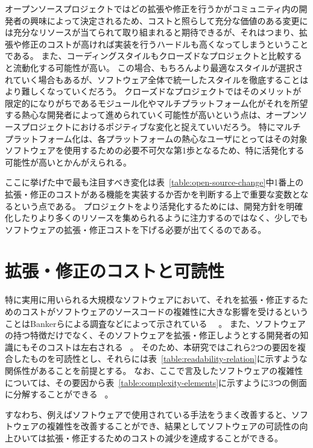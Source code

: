 オープンソースプロジェクトではどの拡張や修正を行うかがコミュニティ内の開発者の興味によって決定されるため、コストと照らして充分な価値のある変更には充分なリソースが当てられて取り組まれると期待できるが、それはつまり、拡張や修正のコストが高ければ実装を行うハードルも高くなってしまうということである。
また、コーディングスタイルもクローズドなプロジェクトと比較すると流動化する可能性が高い。
この場合、もちろんより最適なスタイルが選択されていく場合もあるが、ソフトウェア全体で統一したスタイルを徹底することはより難しくなっていくだろう。
クローズドなプロジェクトではそのメリットが限定的になりがちであるモジュール化やマルチプラットフォーム化がそれを所望する熱心な開発者によって進められていく可能性が高いという点は、オープンソースプロジェクトにおけるポジティブな変化と捉えていいだろう。
特にマルチプラットフォーム化は、各プラットフォームの熱心なユーザにとってはその対象ソフトウェアを使用するための必要不可欠な第1歩となるため、特に活発化する可能性が高いとかんがえられる。

ここに挙げた中で最も注目すべき変化は表~\ref{table:open-source-change}中1番上の拡張・修正のコストがある機能を実装するか否かを判断する上で重要な変数となるという点である。
プロジェクトをより活発化するためには、開発方針を明確化したりより多くのリソースを集められるように注力するのではなく、少しでもソフトウェアの拡張・修正コストを下げる必要が出てくるのである。

\afterpage{\clearpage}
\section{拡張・修正のコストと可読性}
\label{open-source:readability}

特に実用に用いられる大規模なソフトウェアにおいて、それを拡張・修正するためのコストがソフトウェアのソースコードの複雑性に大きな影響を受けるということはBankerらによる調査などによって示されている~\cite{banker-datar} ~\cite{banker-davis}。
また、ソフトウェアの持つ特徴だけでなく、そのソフトウェアを拡張・修正しようとする開発者の知識にもそのコストは左右される ~\cite{elshoff}。
そのため、本研究ではこれら2つの要因を複合したものを可読性とし、それらには表~\ref{table:readability-relation}に示すような関係性があることを前提とする。
なお、ここで言及したソフトウェアの複雑性については、その要因から表~\ref{table:complexity-elements}に示すように3つの側面に分解することができる ~\cite{yu}。

すなわち、例えばソフトウェアで使用されている手法をうまく改善すると、ソフトウェアの複雑性を改善することができ、結果としてソフトウェアの可読性の向上ひいては拡張・修正するためのコストの減少を達成することができる。

